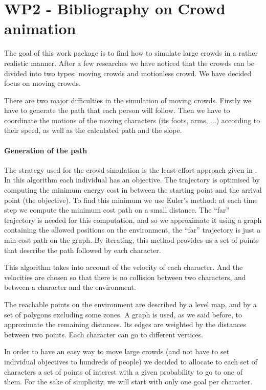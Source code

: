 \section{WP2 - Bibliography on Crowd animation}

The goal of this work package is to find how to simulate large crowds in a rather realistic manner. After a few researches we have noticed that the crowds can be divided into two types: moving crowds and motionless crowd. We have decided focus on moving crowds. 

There are two major difficulties in the simulation of moving crowds. Firstly we have to generate the path that each person will follow. Then we have to coordinate the motions of the moving characters (its foots, arms, ...) according to their speed, as well as the calculated path and the slope.


\paragraph{Generation of the path}

The strategy used for the crowd simulation is the least-effort approach given in \cite{PLE}.\\

In this algorithm each individual has an objective. The trajectory is optimised by computing the minimum energy cost in between the starting point and the arrival point (the objective). To find this minimum we use Euler's method: at each time step we compute the minimum cost path on a small distance. The ``far'' trajectory is needed for this computation, and so we approximate it using a graph containing the allowed positions on the environment, the ``far'' trajectory is just a min-cost path on the graph. By iterating, this method provides us a set of points that describe the path followed by each character.

This algorithm takes into account of the velocity of each character. And the velocities are chosen so that there is no collision between two characters, and between a character and the environment.

The reachable points on the environment are described by a level map, and by a set of polygons excluding some zones. A graph is used, as we said before, to approximate the remaining distances. Its edges are weighted by the distances between two points. Each character can go to different vertices.

In order to have an easy way to move large crowds (and not have to set individual objectives to hundreds of people) we decided to allocate to each set of characters a set of points of interest with a given probability to go to one of them. For the sake of simplicity, we will start with only one goal per character.

